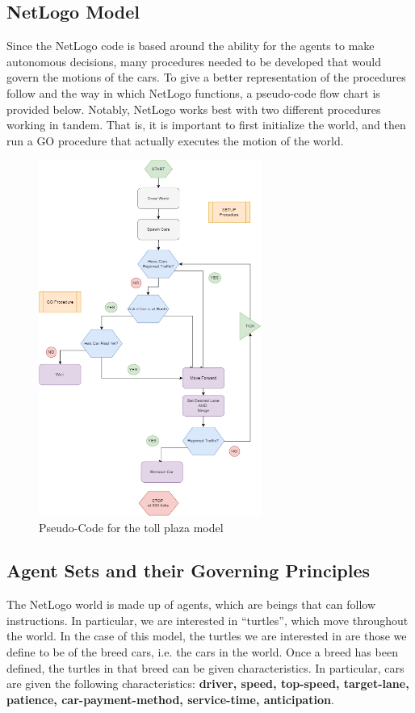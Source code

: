 \documentclass{article}
\begin{document}
\subsection{NetLogo Model}
Since the NetLogo code is based around the ability for the agents to make autonomous decisions, many procedures needed to be developed that would govern the motions of the cars. To give a better representation of the procedures follow and the way in which NetLogo functions, a pseudo-code flow chart is provided below. Notably, NetLogo works best with two different procedures working in tandem. That is, it is important to first initialize the world, and then run a GO procedure that actually executes the motion of the world.

\begin{figure}[H]
    \centering
    \includegraphics[width=0.65\textwidth]{Overview.png}
    \caption [width=0.8\textwidth]{Pseudo-Code for the toll plaza model}
\end{figure}

\subsection{Agent Sets and their Governing Principles}
The NetLogo world is made up of agents, which are beings that can follow instructions. In particular, we are interested in ``turtles'', which move throughout the world. In the case of this model, the turtles we are interested in are those we define to be of the breed cars, i.e. the cars in the world. Once a breed has been defined, the turtles in that breed can be given characteristics. In particular, cars are given the following characteristics: \textbf{driver, speed, top-speed, target-lane, patience, car-payment-method, service-time, anticipation}.
\end{document}

